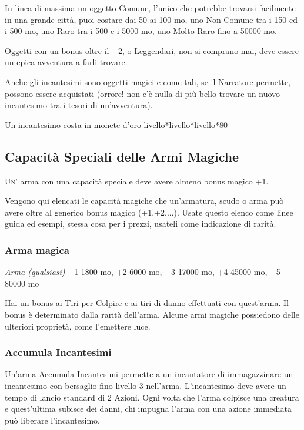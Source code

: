 \begin{multicols}{2}
	In linea di massima un oggetto Comune, l'unico che potrebbe trovarsi facilmente in una grande città, puoi costare dai 50 ai 100 mo, uno Non Comune tra i 150 ed i 500 mo, uno Raro tra i 500 e i 5000 mo, uno Molto Raro fino a 50000 mo.

	Oggetti con un bonus oltre il +2, o Leggendari, non si comprano mai, deve essere un epica avventura a farli trovare.



	\medskip

	Anche gli incantesimi sono oggetti magici e come tali, se il Narratore permette, possono essere acquistati (orrore! non c'è nulla di più bello trovare un nuovo incantesimo tra i tesori di un'avventura).

	Un incantesimo costa in monete d'oro livello*livello*livello*80

	\bigskip

	\subsection{Capacità Speciali delle Armi Magiche}

	\lettrine[lines=2, lhang=0.33, loversize=0.25, findent=1.5em]{U}{n'} arma con una capacità speciale deve avere almeno bonus magico +1.

	Vengono qui elencati le capacità magiche che un'armatura, scudo o arma può avere oltre al generico bonus magico (+1,+2....). Usate questo elenco come linee guida ed esempi, stessa cosa per i prezzi, usateli come indicazione di rarità.

	\subsubsection*{Arma magica}

	\textit{Arma (qualsiasi)} +1 1800 mo, +2 6000 mo, +3 17000 mo, +4 45000 mo, +5 80000 mo

	Hai un bonus ai Tiri per Colpire e ai tiri di danno effettuati con quest'arma. Il bonus è determinato dalla rarità dell'arma. Alcune armi magiche possiedono delle ulteriori proprietà, come l'emettere luce.

	\subsubsection*{Accumula Incantesimi}

	Un'arma Accumula Incantesimi permette a un incantatore di immagazzinare un incantesimo con bersaglio fino livello 3 nell'arma. L'incantesimo deve avere un tempo di lancio standard di 2 Azioni. Ogni volta che l'arma colpisce una creatura e quest'ultima subisce dei danni, chi impugna l'arma con una azione immediata può liberare l'incantesimo.


\end{multicols}
